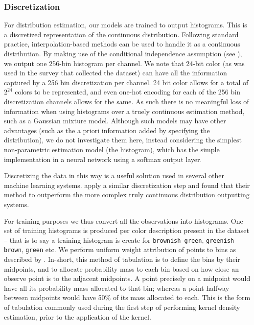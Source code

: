 \documentclass[]{clv3}
\newcommand{\textcite}{\citet}
\newcommand{\natlang}[1]{\texttt{#1}}
\begin{document}
\subsubsection{Discretization} \label{sec:discretization}
For distribution estimation, our models are trained to output histograms.
This is a discretized representation of the continuous distribution.
Following standard practice, interpolation-based methods can be used to handle it as a continuous distribution.
By making use of the conditional independence assumption (see ), we output one 256-bin histogram per channel.
We note that 24-bit color (as was used in the survey that collected the dataset) can have all the information captured by a 256 bin discretization  per channel.
24 bit color allows for a total of $2^{24}$ colors to be represented, and even one-hot encoding for each of the 256 bin discretization channels allows for the same.
As such there is no meaningful loss of information when using histograms over a truely continuous estimation method, such as a Gaussian mixture model.
Although such models may have other advantages (such as the a priori information added by specifying the distribution), we do not investigate them here, instead considering the simplest non-parametric estimation model (the histogram), which has the simple implementation in a neural network using a softmax output layer.

Discretizing the data in this way is a useful solution used in several other machine learning systems.
\textcite{oord2016pixel, DBLP:journals/corr/OordDZSVGKSK16} apply a similar discretization step and found that their method to outperform the more complex truly continuous distribution outputting systems.

For training purposes we thus convert all the observations into histograms.
One set of training histograms is produced per color description present in the dataset -- that is to say a training histogram is create for \natlang{brownish green}, \natlang{greenish brown}, \natlang{green} etc.
We perform uniform weight attribution of points to bins as described by \textcite{jones1984remark}.
In-short, this method of tabulation is to define the bins by their midpoints, and to allocate probability mass to each bin based on how close an observe point is to the adjacent midpoints.
A point precisely on a midpoint would have all its probability mass allocated to that bin;
whereas a point halfway between midpoints would have 50\% of its mass allocated to each.
This is the form of tabulation commonly used during the first step of performing kernel density estimation, prior to the application of the kernel.
\end{document}
